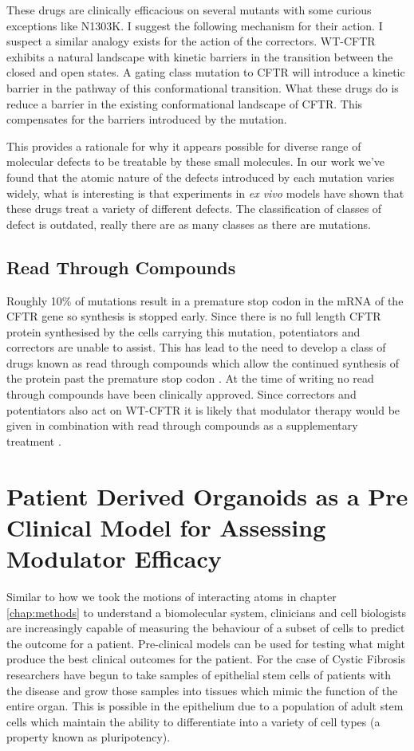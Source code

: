 These drugs are clinically efficacious \cite{VanGoor2014} on several mutants with some curious exceptions like N1303K. I suggest the following mechanism for their action. I suspect a similar analogy exists for the action of the correctors. WT-CFTR exhibits a natural landscape with kinetic barriers in the transition between the closed and open states. A gating class mutation to CFTR will introduce a kinetic barrier in the pathway of this conformational transition. What these drugs do is reduce a barrier in the existing conformational landscape of CFTR. This compensates for the barriers introduced by the mutation. 

This provides a rationale for why it appears possible for diverse range of molecular defects to be treatable by these small molecules. In our work we've found that the atomic nature of the defects introduced by each mutation varies widely, what is interesting is that experiments in \textit{ex vivo} models have shown that these drugs treat a variety of different defects. The classification of classes of defect is outdated, really there are as many classes as there are mutations.

\subsection{Read Through Compounds}
Roughly 10\% of mutations result in a premature stop codon in the mRNA of the CFTR gene so synthesis is stopped early. Since there is no full length CFTR protein synthesised by the cells carrying this mutation, potentiators and correctors are unable to assist. This has lead to the need to develop a class of drugs known as read through compounds which allow the continued synthesis of the protein past the premature stop codon \cite{}. At the  time of writing no read through compounds have been clinically approved. Since correctors and potentiators also act on WT-CFTR it is likely that modulator therapy would be given in combination with read through compounds as a supplementary treatment \cite{}.

\section{Patient Derived Organoids as a Pre Clinical Model for Assessing Modulator Efficacy}
Similar to how we took the motions of interacting atoms in chapter \ref{chap:methods} to understand a biomolecular system, clinicians and cell biologists are increasingly capable of measuring the behaviour of a subset of cells to predict the outcome for a patient. Pre-clinical models can be used for testing what might produce the best clinical outcomes for the patient. For the case of Cystic Fibrosis researchers have begun to take samples of epithelial stem cells of patients with the disease and grow those samples into tissues which mimic the function of the entire organ\cite{depoel2020}. This is possible in the epithelium due to a population of adult stem cells which maintain the ability to differentiate into a variety of cell types (a property known as pluripotency). 


